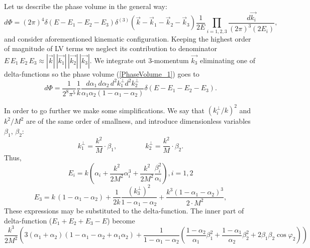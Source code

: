 \documentclass[12pt]{article}
\begin{document}
Let us describe the phase volume in the general way:
\begin{equation}
\label{PhaseVolume_1}
d\Phi =  (2\pi)^4\delta(E-E_1-E_2-E_3)\delta^{(3)}\left(\vec{k} -\vec{k}_1-\vec{k}_2 - \vec{k}_3\right)\frac{1}{2E}\prod_{i=1,2,3}\frac{d\vec{k_i}}{(2\pi)^3(2E_i)},
\end{equation}
and consider aforementioned kinematic configuration. Keeping the highest order of magnitude of LV terms we neglect its contribution to denominator $E\,E_1\,E_2\,E_3 \approx |\vec{k}|\,|\vec{k_1}|\,|\vec{k_2}|\,|\vec{k_3}|$. We integrate out 3-momentum $\vec{k_3}$ eliminating one of delta-functions so the phase volume (\ref{PhaseVolume_1}) goes to
\begin{equation}
\label{PhaseVolume_2}
d\Phi = \frac{1}{2^8\pi^5}\frac{1}{k}\frac{d\alpha_1\, d\alpha_2\, d^2k_1^\perp d^2k_2^\perp}{\alpha_1\alpha_2(1-\alpha_1-\alpha_2)} \delta(E-E_1-E_2-E_3).
\end{equation}

In order to go further we make some simplifications. We say that $(k_i^\perp/k)^2$ and $k^2/M^2$ are of the same order of smallness, and introduce dimensionless variables $\beta_1$, $\beta_2$:
\begin{equation}
k_1^\perp = \frac{k^2}{M}\cdot \beta_1, \qquad \qquad  k_2^\perp = \frac{k^2}{M}\cdot \beta_2.
\end{equation} 
Thus,
\begin{equation}
    E_i=k\left( \alpha_i + \frac{k^2}{2M^2} \alpha^3_i +  \frac{k^2}{2M^2} \frac{\beta^2_i}{\alpha_i}\right), i=1,2
\end{equation}
\begin{equation}
\label{E3}
E_{3} = k\,(1-\alpha_1 - \alpha_2) + \frac{1}{2k}\frac{\left(k_{3}^\perp\right)^2}{1-\alpha_1 - \alpha_2} + \frac{k^3(1-\alpha_1 - \alpha_2)^3}{2\cdot M^2},
\end{equation}
These expressions may be substituted to the delta-function.
The inner part of delta-function ($E_1+E_2+E_3-E$) become
\begin{equation}
   \frac{k^3}{2M^2} \left( 3(\alpha_1+\alpha_2)(1-\alpha_1-\alpha_2 + \alpha_1\alpha_2) + \frac{1}{1-\alpha_1-\alpha_2}\left( \frac{1-\alpha_2}{\alpha_1}\beta_1^2 + \frac{1-\alpha_1}{\alpha_2}\beta_2^2 + 2\beta_1 \beta_2 \cos \varphi_2 \right) \right)   
\end{equation}
\end{document}
